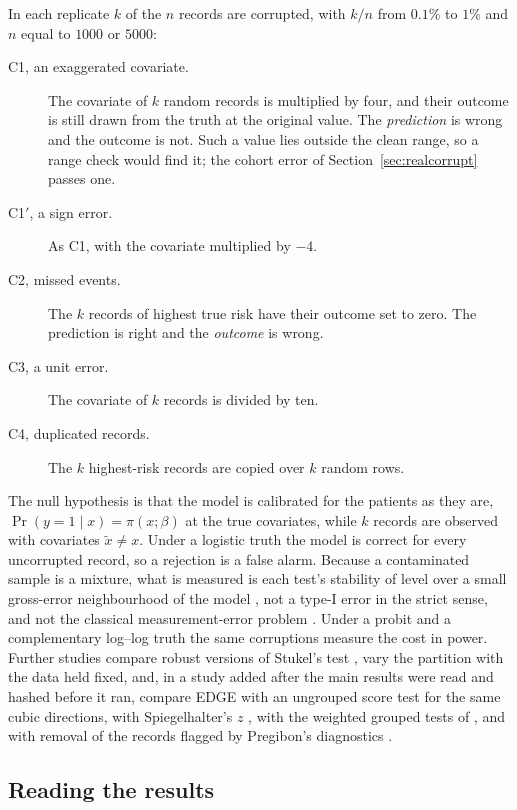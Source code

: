In each replicate $k$ of the $n$ records are corrupted, with $k/n$ from $0.1\%$ to $1\%$ and $n$ equal
to $1000$ or $5000$:
\begin{description}
\item[C1, an exaggerated covariate.] The covariate of $k$ random records is multiplied by four, and
      their outcome is still drawn from the truth at the original value. The \emph{prediction} is wrong
      and the outcome is not. Such a value lies outside the clean range, so a range check would find
      it; the cohort error of Section~\ref{sec:realcorrupt} passes one.
\item[C1$'$, a sign error.] As C1, with the covariate multiplied by $-4$.
\item[C2, missed events.] The $k$ records of highest true risk have their outcome set to zero. The
      prediction is right and the \emph{outcome} is wrong.
\item[C3, a unit error.] The covariate of $k$ records is divided by ten.
\item[C4, duplicated records.] The $k$ highest-risk records are copied over $k$ random rows.
\end{description}
The null hypothesis is that the model is calibrated for the patients as they are,
$\Pr(y=1\mid x)=\pi(x;\beta)$ at the true covariates, while $k$ records are observed with covariates
$\tilde x\neq x$. Under a logistic truth the model is correct for every uncorrupted record, so a
rejection is a false alarm. Because a contaminated sample is a mixture, what is measured is each test's
stability of level over a small gross-error neighbourhood of the model
\citep{huber1964robust,hampel1986robust}, not a type-I error in the strict sense, and not the classical
measurement-error problem \citep{carroll2006measurement}. Under a probit and a complementary log--log
truth the same corruptions measure the cost in power. Further studies compare robust versions of
Stukel's test \citep{cantoni2001robust}, vary the partition with the data held fixed, and, in a study
added after the main results were read and hashed before it ran, compare EDGE with an ungrouped score
test for the same cubic directions, with Spiegelhalter's $z$ \citep{spiegelhalter1986probabilistic},
with the weighted grouped tests of \citet{hosmer2002goodness}, and with removal of the records flagged
by Pregibon's diagnostics \citep{pregibon1981logistic}.

\subsection{Reading the results}\label{sec:reading}

